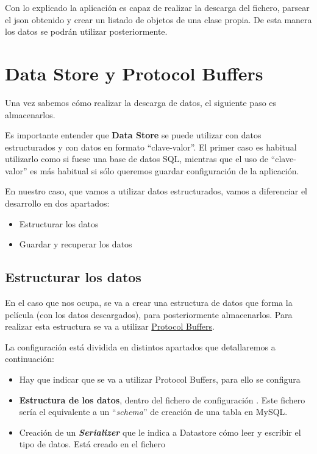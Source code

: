 \documentclass{\ClassPath/viu-tfm-template}
\begin{document}
Con lo explicado la aplicación es capaz de realizar la descarga del fichero, parsear el json obtenido y crear un listado de objetos de una clase propia. De esta manera los datos se podrán utilizar posteriormente.


\section{Data Store y Protocol Buffers}
Una vez sabemos cómo realizar la descarga de datos, el siguiente paso es almacenarlos.

Es importante entender que \textbf{Data Store} se puede utilizar con datos estructurados y con datos en formato “clave-valor”. El primer caso es habitual utilizarlo como si fuese una base de datos SQL, mientras que el uso de “clave-valor” es más habitual si sólo queremos guardar configuración de la aplicación.

En nuestro caso, que vamos a utilizar datos estructurados, vamos a diferenciar el desarrollo en dos apartados:
\begin{itemize}
    \item Estructurar los datos
    \item Guardar y recuperar los datos
\end{itemize}


\subsection{Estructurar los datos}
En el caso que nos ocupa, se va a crear una estructura de datos que forma la película (con los datos descargados), para posteriormente almacenarlos. Para realizar esta estructura se va a utilizar \href{https://developers.google.com/protocol-buffers}{Protocol Buffers}.

La configuración está dividida en distintos apartados que detallaremos a continuación:
\begin{itemize}
    \item Hay que indicar que se va a utilizar Protocol Buffers, para ello se configura 

    \item \textbf{Estructura de los datos}, dentro del fichero de configuración . Este fichero sería el equivalente a un “\textit{schema}” de creación de una tabla en MySQL.

    \item Creación de un \textbf{\textit{Serializer}} que le indica a Datastore cómo leer y escribir el tipo de datos. Está creado en el fichero 
\end{itemize}
\end{document}
